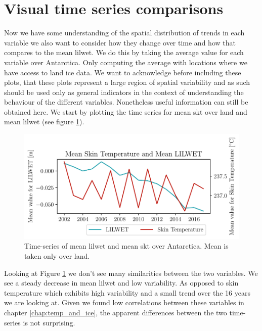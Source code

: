 \documentclass[../main.tex]{subfiles}
\begin{document}
\FloatBarrier
\section{Visual time series comparisons}
Now we have some understanding of the spatial distribution of trends in each variable we also want to consider how they change over time and how that compares to the mean \gls{lilwet}. We do this by taking the average value for each variable over Antarctica. Only computing the average with locations where we have access to land ice data. We want to acknowledge before including these plots, that these plots represent a large region of spatial variability and as such should be used only as general indicators in the context of understanding the behaviour of the different variables. Nonetheless useful information can still be obtained here. We start by plotting the time series for mean \gls{skt} over land and mean \gls{lilwet} (see figure \ref{fig:timeseries_skt}).

\begin{figure}[hbt!]
    \centering
    \includegraphics{images/2021w5/chapter7/hres/tiemseries_skt_LIC}
    \caption{Time-series of mean \gls{lilwet} and mean \gls{skt} over Antarctica. Mean is taken only over land.}
    \label{fig:timeseries_skt}
\end{figure}

Looking at Figure \ref{fig:timeseries_skt} we don't see many similarities between the two variables. We see a steady decrease in mean \gls{lilwet} and low variability. As opposed to skin temperature which exhibits high variability and a small trend  over the 16 years we are looking at. Given we found low correlations between these variables in chapter \ref{chap:temp_and_ice}, the apparent differences between the two time-series is not surprising. 
\end{document}
